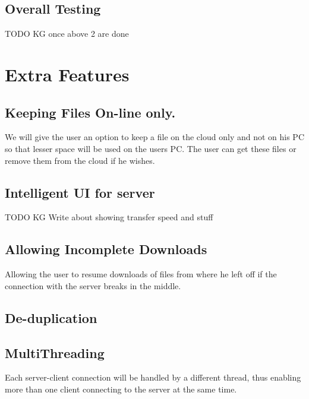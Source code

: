 \documentclass{article}
\begin{document}
			\subsection{Overall Testing}
				TODO KG once above 2 are done

	\section{Extra Features}
		\subsection{Keeping Files On-line only.}
				We will give the user an option to keep a file on the cloud only and not on his PC so that lesser space will be used on the users PC. The user can get these files or remove them from the cloud if he wishes.
		\subsection{Intelligent UI for server}
			TODO KG
			Write about showing transfer speed and stuff
		\subsection{Allowing Incomplete Downloads}
			Allowing the user to resume downloads of files from where he left off if the connection with the server breaks in the middle.
		\subsection{De-duplication}
		\subsection{MultiThreading}
			Each server-client connection will be handled by a different thread, thus enabling more than one client connecting to the server at the same time.
\end{document}

